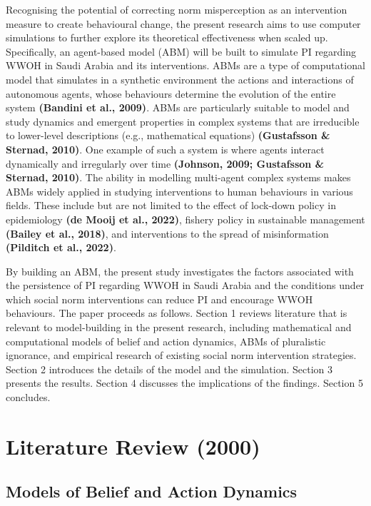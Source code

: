 \documentclass[
  11pt,
]{article}
\begin{document}
Recognising the potential of correcting norm misperception as an
intervention measure to create behavioural change, the present research
aims to use computer simulations to further explore its theoretical
effectiveness when scaled up. Specifically, an agent-based model (ABM)
will be built to simulate PI regarding WWOH in Saudi Arabia and its
interventions. ABMs are a type of computational model that simulates in
a synthetic environment the actions and interactions of autonomous
agents, whose behaviours determine the evolution of the entire system
\textbf{(Bandini et al., 2009)}. ABMs are particularly suitable to model
and study dynamics and emergent properties in complex systems that are
irreducible to lower-level descriptions (e.g., mathematical equations)
\textbf{(Gustafsson \& Sternad, 2010)}. One example of such a system is
where agents interact dynamically and irregularly over time
\textbf{(Johnson, 2009; Gustafsson \& Sternad, 2010)}. The ability in
modelling multi-agent complex systems makes ABMs widely applied in
studying interventions to human behaviours in various fields. These
include but are not limited to the effect of lock-down policy in
epidemiology \textbf{(de Mooij et al., 2022)}, fishery policy in
sustainable management \textbf{(Bailey et al., 2018)}, and interventions
to the spread of misinformation \textbf{(Pilditch et al., 2022)}.

By building an ABM, the present study investigates the factors
associated with the persistence of PI regarding WWOH in Saudi Arabia and
the conditions under which social norm interventions can reduce PI and
encourage WWOH behaviours. The paper proceeds as follows. Section 1
reviews literature that is relevant to model-building in the present
research, including mathematical and computational models of belief and
action dynamics, ABMs of pluralistic ignorance, and empirical research
of existing social norm intervention strategies. Section 2 introduces
the details of the model and the simulation. Section 3 presents the
results. Section 4 discusses the implications of the findings. Section 5
concludes.

\hypertarget{literature-review-2000}{%
\section{Literature Review (2000)}\label{literature-review-2000}}

\hypertarget{models-of-belief-and-action-dynamics}{%
\subsection{Models of Belief and Action
Dynamics}\label{models-of-belief-and-action-dynamics}}
\end{document}

